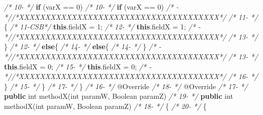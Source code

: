 \documentclass[
]{article}
\newenvironment{Shaded}{\begin{snugshade}}{\end{snugshade}}
\newcommand{\AttributeTok}[1]{\textcolor[rgb]{0.77,0.63,0.00}{#1}}
\newcommand{\BuiltInTok}[1]{#1}
\newcommand{\CommentTok}[1]{\textcolor[rgb]{0.56,0.35,0.01}{\textit{#1}}}
\newcommand{\DataTypeTok}[1]{\textcolor[rgb]{0.13,0.29,0.53}{#1}}
\newcommand{\DecValTok}[1]{\textcolor[rgb]{0.00,0.00,0.81}{#1}}
\newcommand{\FunctionTok}[1]{\textcolor[rgb]{0.00,0.00,0.00}{#1}}
\newcommand{\KeywordTok}[1]{\textcolor[rgb]{0.13,0.29,0.53}{\textbf{#1}}}
\newcommand{\NormalTok}[1]{#1}
\begin{document}
\begin{Shaded}
\begin{Highlighting}[]
\CommentTok{/* 10-   */}        \KeywordTok{if}\NormalTok{ (varX == }\DecValTok{0}\NormalTok{)                                   }\CommentTok{/* 10-   */}        \KeywordTok{if}\NormalTok{ (varX == }\DecValTok{0}\NormalTok{)                                   }
\CommentTok{/*   -   *//*XXXXXXXXXXXXXXXXXXXXXXXXXXXXXXXXXXXXXX*/}               \CommentTok{/* 11-   */}\NormalTok{        \{                                                }
\CommentTok{/* 11-CSB*/}            \KeywordTok{this}\NormalTok{.}\FunctionTok{fieldX}\NormalTok{ = }\DecValTok{1}\NormalTok{;                             }\CommentTok{/* 12-   */}            \KeywordTok{this}\NormalTok{.}\FunctionTok{fieldX}\NormalTok{ = }\DecValTok{1}\NormalTok{;                             }
\CommentTok{/*   -   *//*XXXXXXXXXXXXXXXXXXXXXXXXXXXXXXXXXXXXXX*/}               \CommentTok{/* 13-   */}\NormalTok{        \}                                                            }
\CommentTok{/* 12-   */}        \KeywordTok{else}\NormalTok{\{                                            }\CommentTok{/* 14-   */}        \KeywordTok{else}\NormalTok{\{                                            }
\CommentTok{/* 14-   */}\NormalTok{     \}                                                   }\CommentTok{/*   -   *//*XXXXXXXXXXXXXXXXXXXXXXXXXXXXXXXXXXXXXX*/}               
\CommentTok{/* 13-   */}            \KeywordTok{this}\NormalTok{.}\FunctionTok{fieldX}\NormalTok{ = }\DecValTok{0}\NormalTok{;                             }\CommentTok{/* 15-   */}            \KeywordTok{this}\NormalTok{.}\FunctionTok{fieldX}\NormalTok{ = }\DecValTok{0}\NormalTok{;                             }
\CommentTok{/*   -   *//*XXXXXXXXXXXXXXXXXXXXXXXXXXXXXXXXXXXXXX*/}               \CommentTok{/* 16-   */}\NormalTok{        \}                                                }
\CommentTok{/* 15-   */}\NormalTok{    \}                                                    }\CommentTok{/* 17-   */}\NormalTok{    \}                                                    }
\CommentTok{/* 16-   */}    \AttributeTok{@Override}                                            \CommentTok{/* 18-   */}    \AttributeTok{@Override}                                            
\CommentTok{/* 17-   */}    \KeywordTok{public} \DataTypeTok{int} \FunctionTok{methodX}\NormalTok{(}\DataTypeTok{int}\NormalTok{ paramW, }\BuiltInTok{Boolean}\NormalTok{ paramZ)       }\CommentTok{/* 19-   */}    \KeywordTok{public} \DataTypeTok{int} \FunctionTok{methodX}\NormalTok{(}\DataTypeTok{int}\NormalTok{ paramW, }\BuiltInTok{Boolean}\NormalTok{ paramZ)       }
\CommentTok{/* 18-   */}\NormalTok{    \{                                                    }\CommentTok{/* 20-   */}\NormalTok{    \{                                                    }

\end{Highlighting}
\end{Shaded}
\end{document}
